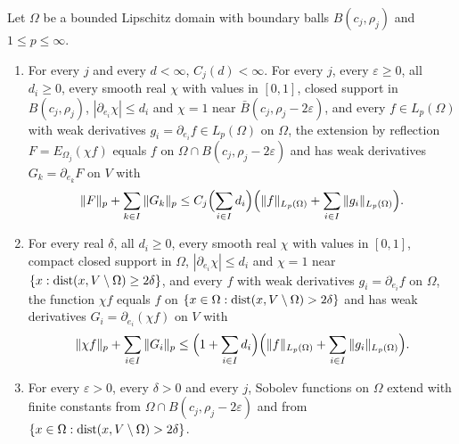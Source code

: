 \begin{lemma}
\label{lem:reflection-patches}
\leanok
{}
Let $\Omega$ be a bounded Lipschitz domain with boundary balls $B(c_j, \rho_j)$ and
$1 \leq p \leq \infty$.
\begin{enumerate}
  \item For every $j$ and every $d < \infty$, $C_j(d) < \infty$. For every $j$, every
    $\varepsilon \geq 0$, all $d_i \geq 0$, every smooth real $\chi$ with values in $[0, 1]$,
    closed support in $B(c_j, \rho_j)$, $|\partial_{e_i} \chi| \leq d_i$ and $\chi = 1$ near
    $\bar B(c_j, \rho_j - 2 \varepsilon)$, and every $f \in L_p(\Omega)$ with weak derivatives
    $g_i = \partial_{e_i} f \in L_p(\Omega)$ on $\Omega$, the extension by reflection
    $F = E_{\Omega_j}(\chi f)$ equals $f$ on $\Omega \cap B(c_j, \rho_j - 2 \varepsilon)$ and has
    weak derivatives $G_k = \partial_{e_k} F$ on $V$ with
    \[
      \|F\|_p + \sum_{k \in I} \|G_k\|_p \leq C_j\Bigl(\sum_{i \in I} d_i\Bigr)
      \Bigl(\|f\|_{L_p(\Omega)} + \sum_{i \in I} \|g_i\|_{L_p(\Omega)}\Bigr) .
    \]
  \item For every real $\delta$, all $d_i \geq 0$, every smooth real $\chi$ with values in
    $[0, 1]$, compact closed support in $\Omega$, $|\partial_{e_i} \chi| \leq d_i$ and $\chi = 1$
    near $\{x : \operatorname{dist}(x, V \setminus \Omega) \geq 2 \delta\}$, and every $f$ with weak derivatives
    $g_i = \partial_{e_i} f$ on $\Omega$, the function $\chi f$ equals $f$ on
    $\{x \in \Omega : \operatorname{dist}(x, V \setminus \Omega) > 2 \delta\}$ and has weak derivatives
    $G_i = \partial_{e_i} (\chi f)$ on $V$ with
    \[
      \|\chi f\|_p + \sum_{i \in I} \|G_i\|_p \leq \Bigl(1 + \sum_{i \in I} d_i\Bigr)
      \Bigl(\|f\|_{L_p(\Omega)} + \sum_{i \in I} \|g_i\|_{L_p(\Omega)}\Bigr) .
    \]
  \item For every $\varepsilon > 0$, every $\delta > 0$ and every $j$, Sobolev functions on
    $\Omega$ extend with finite constants from $\Omega \cap B(c_j, \rho_j - 2 \varepsilon)$ and
    from $\{x \in \Omega : \operatorname{dist}(x, V \setminus \Omega) > 2 \delta\}$.
\end{enumerate}
\end{lemma}

